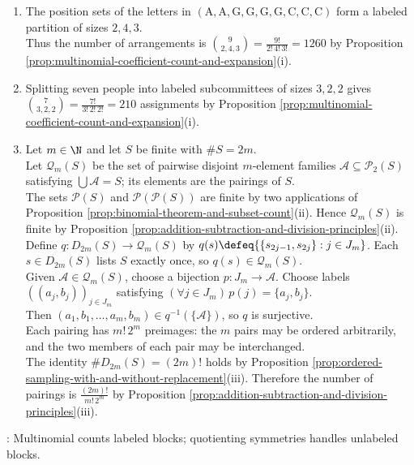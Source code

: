 \begin{example} \label{ex:multinomial-arrangements-and-pairings} 
\begin{enumerate}[label=(\roman*)]
\setlength{\itemsep}{0pt}
\item The position sets of the letters in $(\mathrm{A},\mathrm{A},\mathrm{G},\mathrm{G},\mathrm{G},\mathrm{G},\mathrm{C},\mathrm{C},\mathrm{C})$ form a labeled partition of sizes $2,4,3$.\\
Thus the number of arrangements is $\binom{9}{2,4,3}=\frac{9!}{2!\,4!\,3!}=1260$ by Proposition \ref{prop:multinomial-coefficient-count-and-expansion}(i).
\item Splitting seven people into labeled subcommittees of sizes $3,2,2$ gives $\binom{7}{3,2,2}=\frac{7!}{3!\,2!\,2!}=210$ assignments by Proposition \ref{prop:multinomial-coefficient-count-and-expansion}(i).
\item Let $m\in\N$ and let $S$ be finite with $\#S=2m$.\\
Let $\mathcal{Q}_m(S)$ be the set of pairwise disjoint $m$-element families $\mathcal{A}\subseteq\mathcal{P}_2(S)$ satisfying $\bigcup\mathcal{A}=S$; its elements are the pairings of $S$.\\
The sets $\mathcal{P}(S)$ and $\mathcal{P}(\mathcal{P}(S))$ are finite by two applications of Proposition \ref{prop:binomial-theorem-and-subset-count}(ii). Hence $\mathcal{Q}_m(S)$ is finite by Proposition \ref{prop:addition-subtraction-and-division-principles}(ii).\\
Define $q:D_{2m}(S)\to\mathcal{Q}_m(S)$ by $q(s)\defeq\{\{s_{2j-1},s_{2j}\}:j\in J_m\}$. Each $s\in D_{2m}(S)$ lists $S$ exactly once, so $q(s)\in\mathcal{Q}_m(S)$.\\
Given $\mathcal{A}\in\mathcal{Q}_m(S)$, choose a bijection $p:J_m\to\mathcal{A}$. Choose labels $((a_j,b_j))_{j\in J_m}$ satisfying $(\forall j\in J_m)\,p(j)=\{a_j,b_j\}$.\\
Then $(a_1,b_1,\ldots,a_m,b_m)\in q^{-1}(\{\mathcal{A}\})$, so $q$ is surjective.\\
Each pairing has $m!\,2^m$ preimages: the $m$ pairs may be ordered arbitrarily, and the two members of each pair may be interchanged.\\
The identity $\#D_{2m}(S)=(2m)!$ holds by Proposition \ref{prop:ordered-sampling-with-and-without-replacement}(iii). Therefore the number of pairings is $\frac{(2m)!}{m!\,2^m}$ by Proposition \ref{prop:addition-subtraction-and-division-principles}(iii).
\end{enumerate}
: Multinomial counts labeled blocks; quotienting symmetries handles unlabeled blocks.\\
\end{example}
